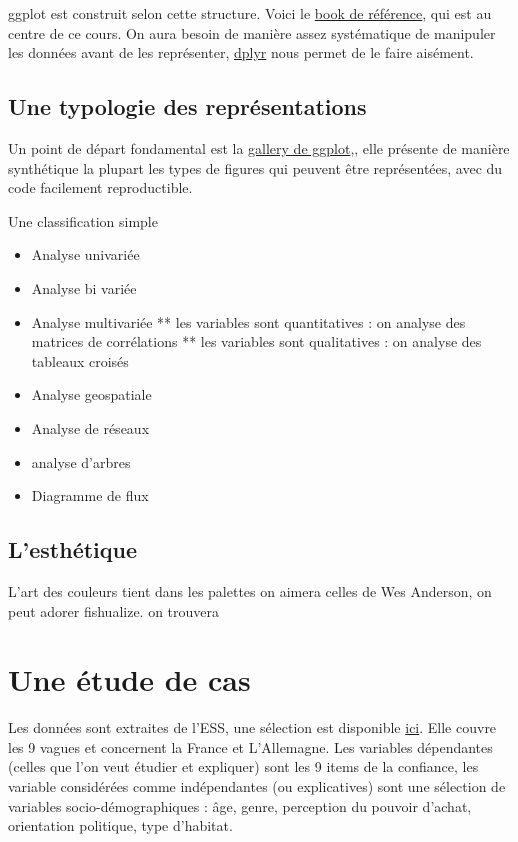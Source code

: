 \documentclass[
]{book}
\providecommand{\tightlist}{%
  \setlength{\itemsep}{0pt}\setlength{\parskip}{0pt}}
\begin{document}
ggplot est construit selon cette structure. Voici le \href{https://ggplot2-book.org/}{book de référence}, qui est au centre de ce cours. On aura besoin de manière assez systématique de manipuler les données avant de les représenter, \href{http://larmarange.github.io/analyse-R/manipuler-les-donnees-avec-dplyr.html}{dplyr} nous permet de le faire aisément.

\hypertarget{une-typologie-des-repruxe9sentations}{%
\subsection{Une typologie des représentations}\label{une-typologie-des-repruxe9sentations}}

Un point de départ fondamental est la \href{https://www.r-graph-gallery.com/}{gallery de ggplot},, elle présente de manière synthétique la plupart les types de figures qui peuvent être représentées, avec du code facilement reproductible.

Une classification simple

\begin{itemize}
\tightlist
\item
  Analyse univariée
\item
  Analyse bi variée
\item
  Analyse multivariée
  ** les variables sont quantitatives : on analyse des matrices de corrélations
  ** les variables sont qualitatives : on analyse des tableaux croisés
\item
  Analyse geospatiale
\item
  Analyse de réseaux
\item
  analyse d'arbres
\item
  Diagramme de flux
\end{itemize}

\hypertarget{lesthuxe9tique}{%
\subsection{L'esthétique}\label{lesthuxe9tique}}

L'art des couleurs tient dans les palettes on aimera celles de Wes Anderson, on peut adorer fishualize. on trouvera

\hypertarget{une-uxe9tude-de-cas}{%
\section{Une étude de cas}\label{une-uxe9tude-de-cas}}

Les données sont extraites de l'ESS, une sélection est disponible \href{}{ici}. Elle couvre les 9 vagues et concernent la France et L'Allemagne. Les variables dépendantes (celles que l'on veut étudier et expliquer) sont les 9 items de la confiance, les variable considérées comme indépendantes (ou explicatives) sont une sélection de variables socio-démographiques : âge, genre, perception du pouvoir d'achat, orientation politique, type d'habitat.
\end{document}
